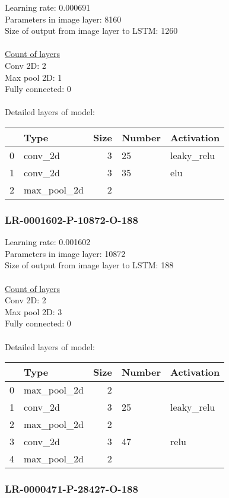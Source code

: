 Learning rate: 0.000691
\\Parameters in image layer: 8160
\\Size of output from image layer to LSTM: 1260
\\\\\underline{Count of layers} 
\\Conv 2D:           2\\Max pool 2D:      1\\Fully connected:  0
\\\\Detailed layers of model: \\\begin{tabular}{rlrll}
\hline
    & Type        &   Size & Number   & Activation   \\
\hline
  0 & conv\_2d     &      3 & 25       & leaky\_relu   \\
  1 & conv\_2d     &      3 & 35       & elu          \\
  2 & max\_pool\_2d &      2 &          &              \\
\hline
\end{tabular}\subsubsection*{LR-0001602-P-10872-O-188}
Learning rate: 0.001602
\\Parameters in image layer: 10872
\\Size of output from image layer to LSTM: 188
\\\\\underline{Count of layers} 
\\Conv 2D:           2\\Max pool 2D:      3\\Fully connected:  0
\\\\Detailed layers of model: \\\begin{tabular}{rlrll}
\hline
    & Type        &   Size & Number   & Activation   \\
\hline
  0 & max\_pool\_2d &      2 &          &              \\
  1 & conv\_2d     &      3 & 25       & leaky\_relu   \\
  2 & max\_pool\_2d &      2 &          &              \\
  3 & conv\_2d     &      3 & 47       & relu         \\
  4 & max\_pool\_2d &      2 &          &              \\
\hline
\end{tabular}\subsubsection*{LR-0000471-P-28427-O-188}
